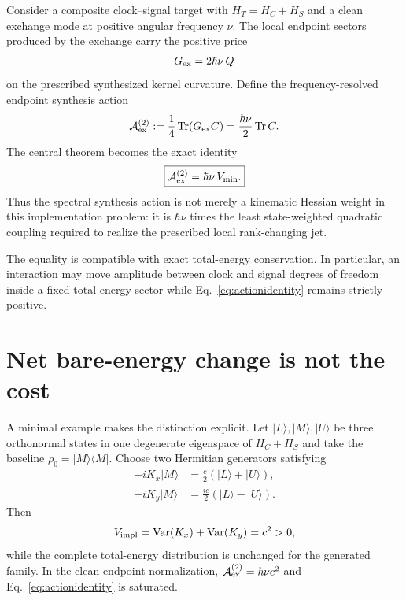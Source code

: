 \documentclass[aps,pra,preprint,nofootinbib]{revtex4-2}
\newcommand{\Tr}{\operatorname{Tr}}
\newcommand{\Var}{\operatorname{Var}}
\newcommand{\cA}{\mathcal A}
\newcommand{\rhozero}{\rho_0}
\newcommand{\Vimpl}{V_{\rm impl}}
\newcommand{\Vmin}{V_{\min}}
\newcommand{\Cker}{C}
\newcommand{\HT}{H_T}
\begin{document}
Consider a composite clock--signal target with $\HT=H_C+H_S$ and a clean exchange mode at positive angular frequency $\nu$. The local endpoint sectors produced by the exchange carry the positive price
\begin{equation}
 G_{\rm ex}=2\hbar\nu\,Q
 \label{eq:Gex}
\end{equation}
on the prescribed synthesized kernel curvature. Define the frequency-resolved endpoint synthesis action
\begin{equation}
 \cA_{\rm ex}^{(2)}:=\frac14\Tr(G_{\rm ex}\Cker)
 =\frac{\hbar\nu}{2}\Tr\Cker.
 \label{eq:Aex}
\end{equation}
The central theorem becomes the exact identity
\begin{equation}
 \boxed{
 \cA_{\rm ex}^{(2)}=\hbar\nu\,\Vmin.
 }
 \label{eq:actionidentity}
\end{equation}
Thus the spectral synthesis action is not merely a kinematic Hessian weight in this implementation problem: it is $\hbar\nu$ times the least state-weighted quadratic coupling required to realize the prescribed local rank-changing jet.

The equality is compatible with exact total-energy conservation. In particular, an interaction may move amplitude between clock and signal degrees of freedom inside a fixed total-energy sector while Eq.~\eqref{eq:actionidentity} remains strictly positive.

\section{Net bare-energy change is not the cost}

A minimal example makes the distinction explicit. Let $|L\rangle,|M\rangle,|U\rangle$ be three orthonormal states in one degenerate eigenspace of $H_C+H_S$ and take the baseline $\rhozero=|M\rangle\langle M|$. Choose two Hermitian generators satisfying
\begin{align}
 -iK_x|M\rangle&=\frac c2(|L\rangle+|U\rangle),\\
 -iK_y|M\rangle&=\frac{ic}{2}(|L\rangle-|U\rangle).
\end{align}
Then
\begin{equation}
 \Vimpl=\Var(K_x)+\Var(K_y)=c^2>0,
\end{equation}
while the complete total-energy distribution is unchanged for the generated family. In the clean endpoint normalization, $\cA_{\rm ex}^{(2)}=\hbar\nu c^2$ and Eq.~\eqref{eq:actionidentity} is saturated.
\end{document}
